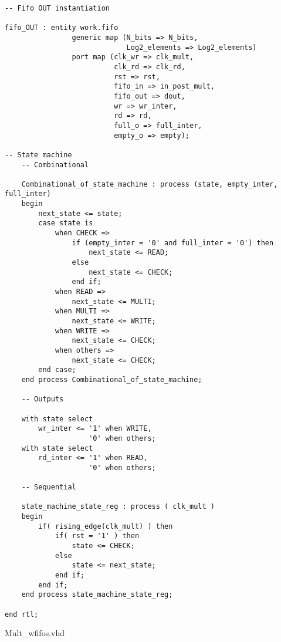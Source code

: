 \begin{code}
\begin{verbatim}
-- Fifo OUT instantiation

fifo_OUT : entity work.fifo
                generic map (N_bits => N_bits,
                             Log2_elements => Log2_elements)
                port map (clk_wr => clk_mult,
                          clk_rd => clk_rd,
                          rst => rst,
                          fifo_in => in_post_mult,
                          fifo_out => dout,
                          wr => wr_inter,
                          rd => rd,
                          full_o => full_inter,
                          empty_o => empty);

-- State machine
    -- Combinational

    Combinational_of_state_machine : process (state, empty_inter, full_inter)
    begin
        next_state <= state;
        case state is
            when CHECK =>
                if (empty_inter = '0' and full_inter = '0') then
                    next_state <= READ;
                else
                    next_state <= CHECK;
                end if;
            when READ =>
                next_state <= MULTI;
            when MULTI =>
                next_state <= WRITE;
            when WRITE =>
                next_state <= CHECK;
            when others =>
                next_state <= CHECK;
        end case;
    end process Combinational_of_state_machine;

    -- Outputs

    with state select
        wr_inter <= '1' when WRITE,
                    '0' when others;
    with state select
        rd_inter <= '1' when READ,
                    '0' when others;

    -- Sequential

    state_machine_state_reg : process ( clk_mult )
    begin
        if( rising_edge(clk_mult) ) then
            if( rst = '1' ) then
                state <= CHECK;
            else
                state <= next_state;
            end if;
        end if;
    end process state_machine_state_reg;

end rtl;
\end{verbatim}
\caption{Mult\_wfifos.vhd}
\label{ap-cod:3}
\end{code}

